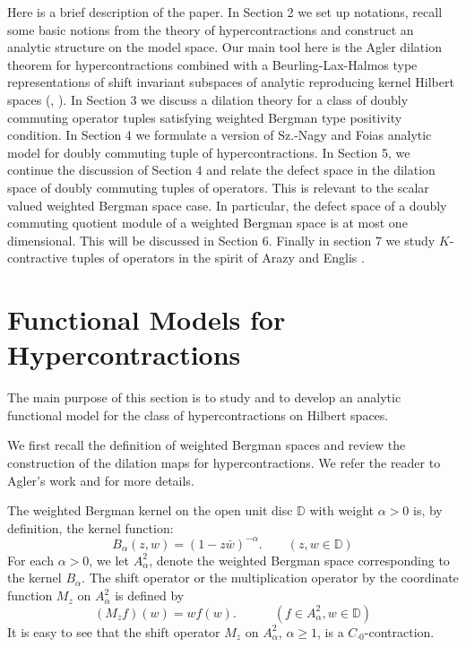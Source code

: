 \documentclass[12pt]{amsart}
\begin{document}
Here is a brief description of the paper. In Section 2 we set up
notations, recall some basic notions from the theory of
hypercontractions and construct an analytic structure on the model
space. Our main tool here is the Agler dilation theorem for
hypercontractions \cite{Ag} combined with a Beurling-Lax-Halmos type
representations of shift invariant subspaces of analytic reproducing
kernel Hilbert spaces (\cite{BV1}, \cite{JS}). In Section 3 we
discuss a dilation theory for a class of doubly commuting operator
tuples satisfying weighted Bergman type positivity condition.  In
Section 4 we formulate a version of Sz.-Nagy and Foias analytic
model for doubly commuting tuple of hypercontractions. In Section 5,
we continue the discussion of Section 4 and relate the defect space
in the dilation space of doubly commuting tuples of operators. This
is relevant to the scalar valued weighted Bergman space case. In
particular, the defect space of a doubly commuting quotient module
of a weighted Bergman space is at most one dimensional. This will be
discussed in Section 6. Finally in section 7 we study
$K$-contractive tuples of operators in the spirit of Arazy and
Englis \cite{AE}.

\section{Functional Models for Hypercontractions}

The main purpose of this section is to study and to develop an
analytic functional model for the class of hypercontractions on
Hilbert spaces.

We first recall the definition of weighted Bergman spaces and review
the construction of the dilation maps for hypercontractions. We
refer the reader to Agler's work \cite{AIEOT} and \cite{Ag} for more
details.

The weighted Bergman kernel on the open unit disc ${\mathbb{D}}$ with weight
$\alpha >0$ is, by definition, the kernel function:
\[B_{\alpha}(z, w) = (1 - z \bar{w})^{-\alpha}. \quad \quad (z, w
\in {\mathbb{D}})\] For each $\alpha
>0$, we let $A^2_{\alpha}$, denote the weighted Bergman space corresponding to the kernel
$B_{\alpha}$. The shift operator or the multiplication operator by
the coordinate function $M_z$ on $A^2_{\alpha}$ is defined by
\[(M_z f)(w) = w f(w). \quad \quad \quad (f \in A^2_{\alpha}, w \in
{\mathbb{D}})\]It is easy to see that the shift operator $M_z$ on
$A^2_{\alpha}$, $\alpha \geq 1$, is a $C_{\cdot 0}$-contraction.
\end{document}
